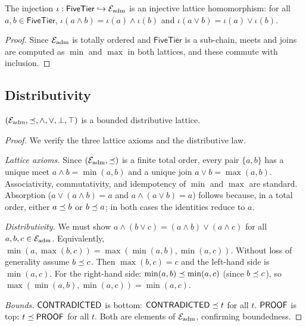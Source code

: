 \documentclass[11pt]{article}
\begin{document}
\begin{proposition}
\label{prop:embedding}
The injection $\iota: \mathsf{FiveTier} \hookrightarrow \mathcal{E}_{\mathrm{adm}}$
is an injective lattice homomorphism: for all $a, b \in
\mathsf{FiveTier}$, $\iota(a \wedge b) = \iota(a) \wedge \iota(b)$
and $\iota(a \vee b) = \iota(a) \vee \iota(b)$.
\end{proposition}

\begin{proof}
Since $\mathcal{E}_{\mathrm{adm}}$ is totally ordered and $\mathsf{FiveTier}$ is a
sub-chain, meets and joins are computed as $\min$ and $\max$
in both lattices, and these commute with inclusion.
\end{proof}

\subsection{Distributivity}

\begin{theorem}\label{thm:distributive}
$(\mathcal{E}_{\mathrm{adm}}, \preceq, \wedge, \vee, \bot, \top)$ is a bounded
distributive lattice.
\end{theorem}

\begin{proof}
We verify the three lattice axioms and the distributive law.

\emph{Lattice axioms.}
Since $(\mathcal{E}_{\mathrm{adm}}, \preceq)$ is a finite total order, every
pair $\{a, b\}$ has a unique meet $a \wedge b = \min(a, b)$
and a unique join $a \vee b = \max(a, b)$.
Associativity, commutativity, and idempotency of $\min$ and
$\max$ are standard.  Absorption ($a \vee (a \wedge b) = a$
and $a \wedge (a \vee b) = a$) follows because, in a total
order, either $a \preceq b$ or $b \preceq a$; in both cases
the identities reduce to $a$.

\emph{Distributivity.}
We must show $a \wedge (b \vee c) = (a \wedge b) \vee (a \wedge c)$
for all $a, b, c \in \mathcal{E}_{\mathrm{adm}}$.  Equivalently,
$\min(a, \max(b, c)) = \max(\min(a, b), \min(a, c))$.
Without loss of generality assume $b \preceq c$.  Then
$\max(b, c) = c$ and the left-hand side is $\min(a, c)$.
For the right-hand side: $\min(a, b) \preceq \min(a, c)$
(since $b \preceq c$), so $\max(\min(a, b), \min(a, c)) = \min(a, c)$.

\emph{Bounds.}
$\mathsf{CONTRADICTED}$ is bottom: $\mathsf{CONTRADICTED} \preceq t$ for all $t$.
$\mathsf{PROOF}$ is top: $t \preceq \mathsf{PROOF}$ for all $t$.
Both are elements of $\mathcal{E}_{\mathrm{adm}}$, confirming bounded\-ness.
\end{proof}
\end{document}
